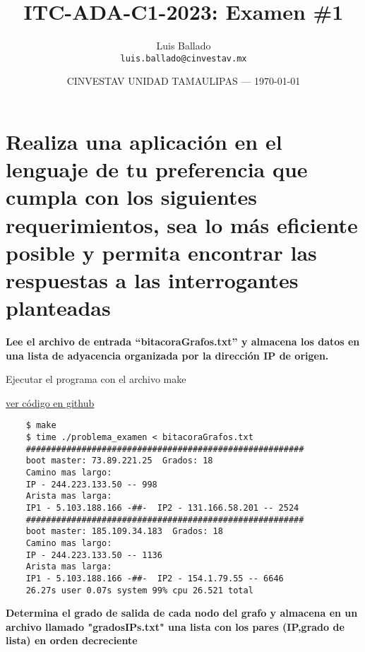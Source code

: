 \documentclass{article}
\title{ITC-ADA-C1-2023: Examen \#1} %
\author{Luis Ballado\\ \texttt{luis.ballado@cinvestav.mx}} %
\date{CINVESTAV UNIDAD TAMAULIPAS --- \today} %
\begin{document}
\maketitle %


\section{Realiza una aplicación en el lenguaje de tu preferencia que cumpla con los siguientes requerimientos, sea lo más eficiente posible y permita encontrar las respuestas a las interrogantes planteadas}

\begin{question}
  \textbf{Lee el archivo de entrada “bitacoraGrafos.txt” y almacena los datos en una lista de adyacencia organizada por la dirección IP de origen.}
\end{question}


\begin{warn}[]
  Ejecutar el programa con el archivo make
\end{warn}

\href{https://github.com/luisballado/ADA/blob/main/practice_code/problem_exam/problema_examen.cpp}{ver código en github}\\   

\begin{commandline}
  \begin{verbatim}
    $ make
    $ time ./problema_examen < bitacoraGrafos.txt
    #######################################################
    boot master: 73.89.221.25  Grados: 18
    Camino mas largo: 
    IP - 244.223.133.50 -- 998
    Arista mas larga: 
    IP1 - 5.103.188.166 -##-  IP2 - 131.166.58.201 -- 2524
    #######################################################
    boot master: 185.109.34.183  Grados: 18
    Camino mas largo: 
    IP - 244.223.133.50 -- 1136
    Arista mas larga: 
    IP1 - 5.103.188.166 -##-  IP2 - 154.1.79.55 -- 6646
    26.27s user 0.07s system 99% cpu 26.521 total
  \end{verbatim}
\end{commandline}

\newpage
\begin{question}
  \textbf{Determina el grado de salida de cada nodo del grafo y almacena en un archivo llamado "gradosIPs.txt" una lista con los pares (IP,grado de lista) en orden decreciente}
\end{question}
\end{document}
